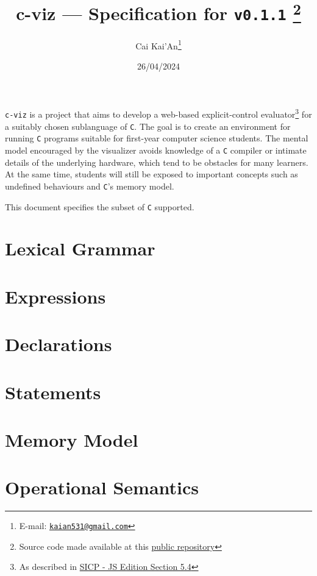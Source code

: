 \documentclass[11pt]{article}
\title{%
  \textsf{c-viz} --- Specification for \texttt{v0.1.1}%
  \footnote{Source code made available at this \href{https://github.com/caipng/c-viz/tree/d1f985e7ef38a52ca8c50dae77cd190145ecdfb2}{public repository}}}
\author{Cai Kai'An\footnote{E-mail: %
  \href{mailto:kaian531@gmail.com}{\texttt{kaian531@gmail.com}}}}
\date{26/04/2024}
\begin{document}
\maketitle

\vfill

\verb|c-viz| is a project that aims to develop a web-based explicit-control evaluator\footnote{As described in \href{https://sourceacademy.org/sicpjs/5.4}{SICP - JS Edition Section 5.4}} for a suitably chosen sublanguage of \verb|C|.
The goal is to create an environment for running \verb|C| programs suitable for first-year computer science students.
The mental model encouraged by the visualizer avoids knowledge of a \verb|C| compiler or intimate details of the underlying hardware, which tend to be obstacles for many learners.
At the same time, students will still be exposed to important concepts such as undefined behaviours and \verb|C|'s memory model.
\par
\medskip
This document specifies the subset of \verb|C| supported.

\begingroup
  \hypersetup{hidelinks}
  \tableofcontents
\endgroup

\bigskip




\section{Lexical Grammar}\label{sec:lexgrammar}
\section{Expressions}\label{sec:expr}
\section{Declarations}\label{sec:decl}
\section{Statements}\label{sec:stmt}



\section{Memory Model}\label{sec:memory}
\section{Operational Semantics}\label{sec:opsem}

\newpage
\appendix

\end{document}
